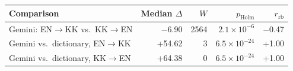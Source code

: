 \begin{tabular}{@{}lrrrr@{}}
\toprule
Comparison & Median $\Delta$ & $W$ & $p_{\mathrm{Holm}}$ & $r_{\mathrm{rb}}$ \\
\midrule
Gemini: EN$\rightarrow$KK vs.\ KK$\rightarrow$EN & $-$6.90 & 2564 & $2.1\times10^{-6}$ & $-$0.47 \\
Gemini vs.\ dictionary, EN$\rightarrow$KK & +54.62 & 3 & $6.5\times10^{-24}$ & +1.00 \\
Gemini vs.\ dictionary, KK$\rightarrow$EN & +64.38 & 0 & $6.5\times10^{-24}$ & +1.00 \\
\bottomrule
\end{tabular}
